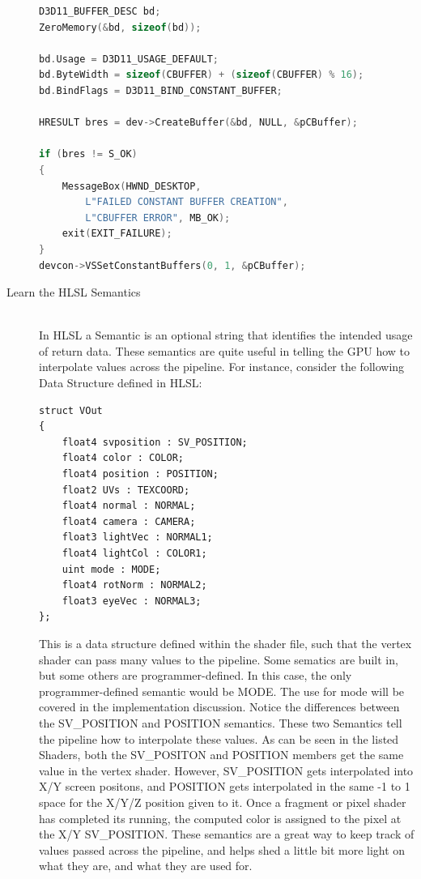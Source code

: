 \documentclass[a4paper, 12pt]{article}
\begin{document}
\begin{description}
\begin{lstlisting}[language=C++]
D3D11_BUFFER_DESC bd;
ZeroMemory(&bd, sizeof(bd));

bd.Usage = D3D11_USAGE_DEFAULT;
bd.ByteWidth = sizeof(CBUFFER) + (sizeof(CBUFFER) % 16);
bd.BindFlags = D3D11_BIND_CONSTANT_BUFFER;

HRESULT bres = dev->CreateBuffer(&bd, NULL, &pCBuffer);

if (bres != S_OK)
{
	MessageBox(HWND_DESKTOP, 
		L"FAILED CONSTANT BUFFER CREATION", 
		L"CBUFFER ERROR", MB_OK);
	exit(EXIT_FAILURE);
}
devcon->VSSetConstantBuffers(0, 1, &pCBuffer);
\end{lstlisting}

\item[Learn the HLSL Semantics] \hfill \\

In HLSL a Semantic is an optional string that identifies the intended usage of
return data. These semantics are quite useful in telling the GPU how to
interpolate values across the pipeline. For instance, consider the following
Data Structure defined in HLSL:

\begin{lstlisting}[language=HLSL, numbers=none, frame=none]
struct VOut
{
	float4 svposition : SV_POSITION;
	float4 color : COLOR;
	float4 position : POSITION;
	float2 UVs : TEXCOORD;
	float4 normal : NORMAL;
	float4 camera : CAMERA;
	float3 lightVec : NORMAL1;
	float4 lightCol : COLOR1;
	uint mode : MODE;
	float4 rotNorm : NORMAL2;
	float3 eyeVec : NORMAL3;
};
\end{lstlisting}

This is a data structure defined within the shader file, such that the vertex
shader can pass many values to the pipeline. Some sematics are built in, but
some others are programmer-defined. In this case, the only programmer-defined
semantic would be MODE. The use for mode will be covered in the implementation
discussion. Notice the differences between the SV\_POSITION and POSITION
semantics. These two Semantics tell the pipeline how to interpolate these
values. As can be seen in the listed Shaders, both the SV\_POSITON and
POSITION members get the same value in the vertex shader. However,
SV\_POSITION gets interpolated into X/Y screen positons, and POSITION gets
interpolated in the same -1 to 1 space for the X/Y/Z position given to it.
Once a fragment or pixel shader has completed its running, the computed color
is assigned to the pixel at the X/Y SV\_POSITION. These semantics are a great
way to keep track of values passed across the pipeline, and helps shed a
little bit more light on what they are, and what they are used for.


\end{description}
\end{document}
